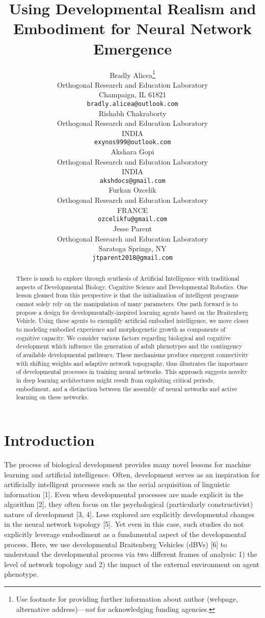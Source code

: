 \documentclass{article}
\title{Using Developmental Realism and Embodiment for Neural Network Emergence}
\author{%
  Bradly Alicea\thanks{Use footnote for providing further information
    about author (webpage, alternative address)---\emph{not} for acknowledging
    funding agencies.} \\
  Orthogonal Research and Education Laboratory\\
  Champaign, IL 61821 \\
  \texttt{bradly.alicea@outlook.com} \\
\And
  Rishabh Chakraborty \\
  Orthogonal Research and Education Laboratory \\
  INDIA \\
   \texttt{exynos999@outlook.com} \\
\And
  Akshara Gopi \\
  Orthogonal Research and Education Laboratory \\
  INDIA \\
   \texttt{akshdocs@gmail.com} \\
\And
  Furkan Ozcelik \\
  Orthogonal Research and Education Laboratory \\
  FRANCE \\
   \texttt{ozcelikfu@gmail.com} \\
\And
  Jesse Parent \\
  Orthogonal Research and Education Laboratory \\
  Saratoga Springs, NY \\
   \texttt{jtparent2018@gmail.com} \\
\AND

}
\begin{document}
\maketitle

\begin{abstract}
There is much to explore through synthesis of Artificial Intelligence with traditional aspects of Developmental Biology, Cognitive Science and Developmental Robotics. One lesson gleaned from this perspective is that the initialization of intelligent programs cannot solely rely on the manipulation of many parameters. One path forward is to propose a design for developmentally-inspired learning agents based on the Braitenberg Vehicle. Using these agents to exemplify artificial embodied intelligence, we move closer to modeling embodied experience and morphogenetic growth as components of cognitive capacity. We consider various factors regarding biological and cognitive development  which influence the generation of  adult phenotypes and the contingency of available developmental pathways. These mechanisms produce emergent connectivity with shifting weights and adaptive network topography, thus illustrates the importance of developmental processes in training neural networks. This approach suggests novelty in deep learning architectures might result from exploiting critical periods, embodiment, and a distinction between the assembly of neural networks and active learning on these networks.
\end{abstract}

\section{Introduction}

The process of biological development provides many novel lessons for machine learning and artificial intelligence. Often, development serves as an inspiration for artificially intelligent processes such as the serial acquisition of linguistic information [1]. Even when developmental processes are made explicit in the algorithm [2], they often focus on the psychological (particularly constructivist) nature of development [3, 4]. Less explored are explicitly developmental changes in the neural network topology [5]. Yet even in this case, such studies do not explicitly leverage embodiment as a fundamental aspect of the developmental process. Here, we use developmental Braitenberg Vehicles (dBVs) [6] to understand the developmental process via two different frames of analysis: 1) the level of network topology and 2) the impact of the external environment on agent phenotype. 
\end{document}
